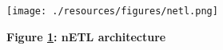 \begin{figure}[H]
    \centering
    \begin{mdframed}
        \centering
        \texttt{[image: ./resources/figures/netl.png]}
    \end{mdframed}
    \caption[nETL Architecture]{\textbf{Figure \ref{fig-nETL}: nETL architecture}}
    \label{fig-nETL}
\end{figure}